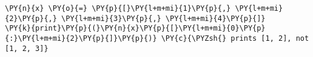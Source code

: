\begin{Verbatim}[commandchars=\\\{\}]
\PY{n}{x} \PY{o}{=} \PY{p}{[}\PY{l+m+mi}{1}\PY{p}{,} \PY{l+m+mi}{2}\PY{p}{,} \PY{l+m+mi}{3}\PY{p}{,} \PY{l+m+mi}{4}\PY{p}{]}
\PY{k}{print}\PY{p}{(}\PY{n}{x}\PY{p}{[}\PY{l+m+mi}{0}\PY{p}{:}\PY{l+m+mi}{2}\PY{p}{]}\PY{p}{)} \PY{c}{\PYZsh{} prints [1, 2], not [1, 2, 3]}
\end{Verbatim}
